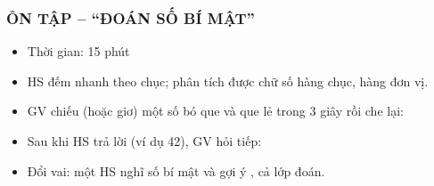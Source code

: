 \documentclass[../main.tex]{subfiles}
\begin{document}
\subsubsection{ÔN TẬP -- “ĐOÁN SỐ BÍ MẬT”}
\begin{hd}
    \begin{itemize}
        \item Thời gian: 15 phút
        \item HS đếm nhanh theo chục; phân tích được chữ số hàng chục, hàng đơn vị.
    \end{itemize}
\end{hd}
\begin{itemize}
    \item GV chiếu (hoặc giơ) một số bó que và que lẻ trong 3 giây rồi che lại: 
    \item Sau khi HS trả lời (ví dụ 42), GV hỏi tiếp: 
    \item Đổi vai: một HS nghĩ số bí mật và gợi ý , cả lớp đoán.
\end{itemize}
\begin{center}
    \quad{}\quad{}
\end{center}

\end{document}
